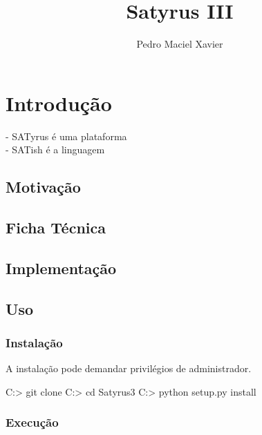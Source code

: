 \documentclass[12pt]{satyrus}
\title{Satyrus III}
\author{Pedro Maciel Xavier}
\begin{document}
    \maketitle
    
    \newpage

    \tableofcontents

    \chapter{Introdução}
    
    - SATyrus é uma plataforma\\
    - SATish é a linguagem\\
    
    \section{Motivação}

    \section{Ficha Técnica}

    \section{Implementação}

    \section{Uso}
    
    \subsection{Instalação}
    
    A instalação pode demandar privilégios de administrador.
    
	
	\begin{shell}
	C:\Users\User> git clone
	C:\Users\User> cd Satyrus3
	C:\Users\User{}> python setup.py install
	\end{shell}

    \subsection{Execução}
    
\end{document}
